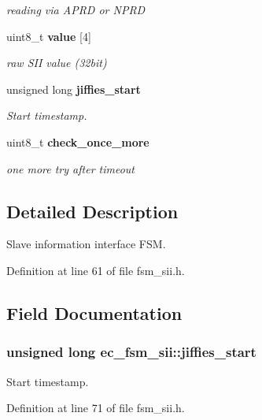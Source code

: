 \begin{DoxyCompactItemize}
\begin{DoxyCompactList}\small\item\em reading via A\-P\-R\-D or N\-P\-R\-D \end{DoxyCompactList}\item 
uint8\-\_\-t {\bf value} [4]\label{structec__fsm__sii_ac95eca9edba43bc2e9e6354a35f6cd77}

\begin{DoxyCompactList}\small\item\em raw S\-I\-I value (32bit) \end{DoxyCompactList}\item 
unsigned long {\bf jiffies\-\_\-start}
\begin{DoxyCompactList}\small\item\em Start timestamp. \end{DoxyCompactList}\item 
uint8\-\_\-t {\bf check\-\_\-once\-\_\-more}\label{structec__fsm__sii_aa42a961a6e212bced0051dbf569b47c3}

\begin{DoxyCompactList}\small\item\em one more try after timeout \end{DoxyCompactList}\end{DoxyCompactItemize}


\subsection{Detailed Description}
Slave information interface F\-S\-M. 

Definition at line 61 of file fsm\-\_\-sii.\-h.



\subsection{Field Documentation}
\subsubsection[{jiffies\-\_\-start}]{\setlength{\rightskip}{0pt plus 5cm}unsigned long ec\-\_\-fsm\-\_\-sii\-::jiffies\-\_\-start}\label{structec__fsm__sii_ab7f2a8187c72c4dcd08235b1533062b5}


Start timestamp. 



Definition at line 71 of file fsm\-\_\-sii.\-h.

